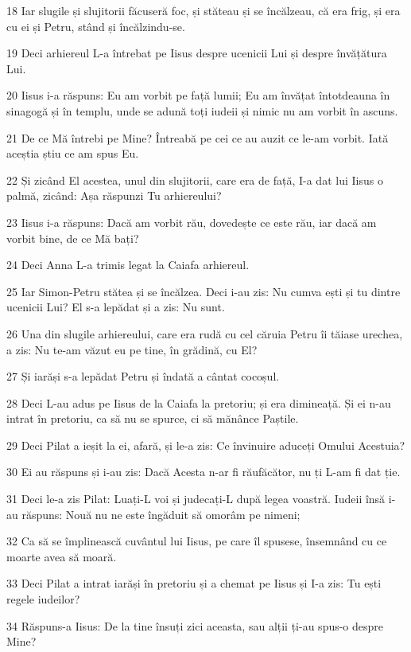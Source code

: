 \par 18 Iar slugile și slujitorii făcuseră foc, și stăteau și se încălzeau, că era frig, și era cu ei și Petru, stând și încălzindu-se.
\par 19 Deci arhiereul L-a întrebat pe Iisus despre ucenicii Lui și despre învățătura Lui.
\par 20 Iisus i-a răspuns: Eu am vorbit pe față lumii; Eu am învățat întotdeauna în sinagogă și în templu, unde se adună toți iudeii și nimic nu am vorbit în ascuns.
\par 21 De ce Mă întrebi pe Mine? Întreabă pe cei ce au auzit ce le-am vorbit. Iată aceștia știu ce am spus Eu.
\par 22 Și zicând El acestea, unul din slujitorii, care era de față, I-a dat lui Iisus o palmă, zicând: Așa răspunzi Tu arhiereului?
\par 23 Iisus i-a răspuns: Dacă am vorbit rău, dovedește ce este rău, iar dacă am vorbit bine, de ce Mă bați?
\par 24 Deci Anna L-a trimis legat la Caiafa arhiereul.
\par 25 Iar Simon-Petru stătea și se încălzea. Deci i-au zis: Nu cumva ești și tu dintre ucenicii Lui? El s-a lepădat și a zis: Nu sunt.
\par 26 Una din slugile arhiereului, care era rudă cu cel căruia Petru îi tăiase urechea, a zis: Nu te-am văzut eu pe tine, în grădină, cu El?
\par 27 Și iarăși s-a lepădat Petru și îndată a cântat cocoșul.
\par 28 Deci L-au adus pe Iisus de la Caiafa la pretoriu; și era dimineață. Și ei n-au intrat în pretoriu, ca să nu se spurce, ci să mănânce Paștile.
\par 29 Deci Pilat a ieșit la ei, afară, și le-a zis: Ce învinuire aduceți Omului Acestuia?
\par 30 Ei au răspuns și i-au zis: Dacă Acesta n-ar fi răufăcător, nu ți L-am fi dat ție.
\par 31 Deci le-a zis Pilat: Luați-L voi și judecați-L după legea voastră. Iudeii însă i-au răspuns: Nouă nu ne este îngăduit să omorâm pe nimeni;
\par 32 Ca să se împlinească cuvântul lui Iisus, pe care îl spusese, însemnând cu ce moarte avea să moară.
\par 33 Deci Pilat a intrat iarăși în pretoriu și a chemat pe Iisus și I-a zis: Tu ești regele iudeilor?
\par 34 Răspuns-a Iisus: De la tine însuți zici aceasta, sau alții ți-au spus-o despre Mine?
